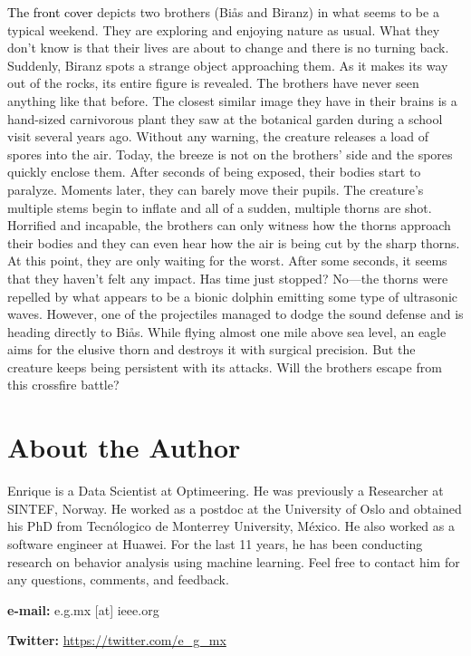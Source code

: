 \documentclass[
  11pt,
]{krantz}
\begin{document}
\textcolor{black}{The front cover} depicts two brothers (Biås and Biranz) in what seems to be a typical weekend. They are exploring and enjoying nature as usual. What they don't know is that their lives are about to change and there is no turning back. Suddenly, Biranz spots a strange object approaching them. As it makes its way out of the rocks, its entire figure is revealed. The brothers have never seen anything like that before. The closest similar image they have in their brains is a hand-sized carnivorous plant they saw at the botanical garden during a school visit several years ago. Without any warning, the creature releases a load of spores into the air. Today, the breeze is not on the brothers' side and the spores quickly enclose them. After seconds of being exposed, their bodies start to paralyze. Moments later, they can barely move their pupils. The creature's multiple stems begin to inflate and all of a sudden, multiple thorns are shot. Horrified and incapable, the brothers can only witness how the thorns approach their bodies and they can even hear how the air is being cut by the sharp thorns. At this point, they are only waiting for the worst. After some seconds, it seems that they haven't felt any impact. Has time just stopped? No---the thorns were repelled by what appears to be a bionic dolphin emitting some type of ultrasonic waves. However, one of the projectiles managed to dodge the sound defense and is heading directly to Biås. While flying almost one mile above sea level, an eagle aims for the elusive thorn and destroys it with surgical precision. But the creature keeps being persistent with its attacks. Will the brothers escape from this crossfire battle?

\hypertarget{about-the-author}{%
\section*{About the Author}\label{about-the-author}}


Enrique is a Data Scientist at Optimeering. He was previously a Researcher at SINTEF, Norway. He worked as a postdoc at the University of Oslo and obtained his PhD from Tecnólogico de Monterrey University, México. He also worked as a software engineer at Huawei. For the last 11 years, he has been conducting research on behavior analysis using machine learning. Feel free to contact him for any questions, comments, and feedback.

\textbf{e-mail:} e.g.mx {[}at{]} ieee.org

\textbf{Twitter:} \url{https://twitter.com/e_g_mx}
\end{document}
